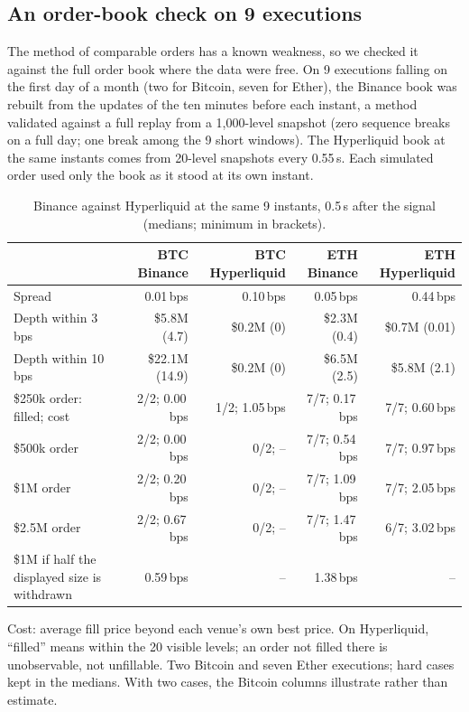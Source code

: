 \documentclass[11pt,a4paper]{article}
\newcommand{\bps}{\,bps}
\newcommand{\thead}[1]{{\sffamily\bfseries\footnotesize #1}}
\begin{document}
\subsection{An order-book check on 9 executions}
The method of comparable orders has a known weakness, so we checked it against the full order book where the data were free.
On 9 executions falling on the first day of a month (two for Bitcoin, seven for Ether), the Binance book was rebuilt from the
updates of the ten minutes before each instant, a method validated against a full replay from a 1{,}000-level snapshot (zero
sequence breaks on a full day; one break among the 9 short windows). The Hyperliquid book at
the same instants comes from 20-level snapshots every 0.55\,s. Each simulated order used only the book as it stood at its own
instant.

\begin{table}[H]
\centering\small
\begin{threeparttable}
\caption{Binance against Hyperliquid at the same 9 instants, 0.5\,s after the signal (medians; minimum in brackets).}
\label{tab:l2}
\begin{tabular}{@{}lrrrr@{}}
\toprule
& \thead{BTC Binance} & \thead{BTC Hyperliquid} & \thead{ETH Binance} & \thead{ETH Hyperliquid}\\
\midrule
Spread & 0.01\bps & 0.10\bps & 0.05\bps & 0.44\bps\\
Depth within 3\bps & \$5.8M (4.7) & \$0.2M (0) & \$2.3M (0.4) & \$0.7M (0.01)\\
Depth within 10\bps & \$22.1M (14.9) & \$0.2M (0) & \$6.5M (2.5) & \$5.8M (2.1)\\
\$250k order: filled; cost & 2/2; 0.00\bps & 1/2; 1.05\bps & 7/7; 0.17\bps & 7/7; 0.60\bps\\
\$500k order & 2/2; 0.00\bps & 0/2; -- & 7/7; 0.54\bps & 7/7; 0.97\bps\\
\$1M order & 2/2; 0.20\bps & 0/2; -- & 7/7; 1.09\bps & 7/7; 2.05\bps\\
\$2.5M order & 2/2; 0.67\bps & 0/2; -- & 7/7; 1.47\bps & 6/7; 3.02\bps\\
\$1M if half the displayed size is withdrawn & 0.59\bps & -- & 1.38\bps & --\\
\bottomrule
\end{tabular}
\begin{tablenotes}[flushleft]\footnotesize
\item Cost: average fill price beyond each venue's own best price. On Hyperliquid, ``filled'' means within the 20 visible levels;
an order not filled there is unobservable, not unfillable. Two Bitcoin and seven Ether executions; hard cases kept in the medians.
With two cases, the Bitcoin columns illustrate rather than estimate.
\end{tablenotes}
\end{threeparttable}
\end{table}
\end{document}
